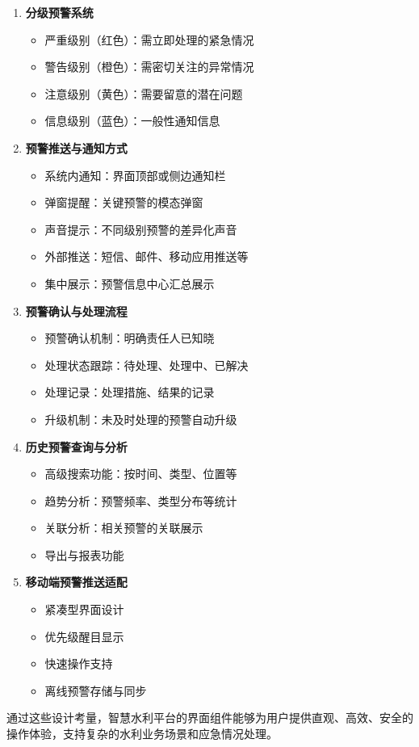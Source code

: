 \begin{enumerate}
\def\labelenumi{\arabic{enumi}.}
\tightlist
\item
  \textbf{分级预警系统}

  \begin{itemize}
  \tightlist
  \item
    严重级别（红色）：需立即处理的紧急情况
  \item
    警告级别（橙色）：需密切关注的异常情况
  \item
    注意级别（黄色）：需要留意的潜在问题
  \item
    信息级别（蓝色）：一般性通知信息
  \end{itemize}
\item
  \textbf{预警推送与通知方式}

  \begin{itemize}
  \tightlist
  \item
    系统内通知：界面顶部或侧边通知栏
  \item
    弹窗提醒：关键预警的模态弹窗
  \item
    声音提示：不同级别预警的差异化声音
  \item
    外部推送：短信、邮件、移动应用推送等
  \item
    集中展示：预警信息中心汇总展示
  \end{itemize}
\item
  \textbf{预警确认与处理流程}

  \begin{itemize}
  \tightlist
  \item
    预警确认机制：明确责任人已知晓
  \item
    处理状态跟踪：待处理、处理中、已解决
  \item
    处理记录：处理措施、结果的记录
  \item
    升级机制：未及时处理的预警自动升级
  \end{itemize}
\item
  \textbf{历史预警查询与分析}

  \begin{itemize}
  \tightlist
  \item
    高级搜索功能：按时间、类型、位置等
  \item
    趋势分析：预警频率、类型分布等统计
  \item
    关联分析：相关预警的关联展示
  \item
    导出与报表功能
  \end{itemize}
\item
  \textbf{移动端预警推送适配}

  \begin{itemize}
  \tightlist
  \item
    紧凑型界面设计
  \item
    优先级醒目显示
  \item
    快速操作支持
  \item
    离线预警存储与同步
  \end{itemize}
\end{enumerate}

通过这些设计考量，智慧水利平台的界面组件能够为用户提供直观、高效、安全的操作体验，支持复杂的水利业务场景和应急情况处理。
